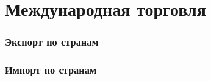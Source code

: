 \section{Международная торговля}

\begin{frame}
    \frametitle{Экспорт по странам}
    \begin{center}
        
    \end{center}
\end{frame}

\begin{frame}
    \frametitle{Импорт по странам}
    \begin{center}
        
    \end{center}
\end{frame}